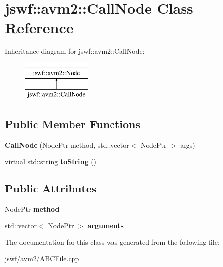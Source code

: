 \hypertarget{classjswf_1_1avm2_1_1_call_node}{\section{jswf\+:\+:avm2\+:\+:Call\+Node Class Reference}
\label{classjswf_1_1avm2_1_1_call_node}
}
Inheritance diagram for jswf\+:\+:avm2\+:\+:Call\+Node\+:\begin{figure}[H]
\begin{center}
\leavevmode
\includegraphics[height=2.000000cm]{classjswf_1_1avm2_1_1_call_node}
\end{center}
\end{figure}
\subsection*{Public Member Functions}
\begin{DoxyCompactItemize}
\item 
\hypertarget{classjswf_1_1avm2_1_1_call_node_a6be5d2f8dcafdc57b56689423060b9d6}{{\bfseries Call\+Node} (Node\+Ptr method, std\+::vector$<$ Node\+Ptr $>$ args)}\label{classjswf_1_1avm2_1_1_call_node_a6be5d2f8dcafdc57b56689423060b9d6}

\item 
\hypertarget{classjswf_1_1avm2_1_1_call_node_a6ff7d0186fa230106c49a1a562409a3b}{virtual std\+::string {\bfseries to\+String} ()}\label{classjswf_1_1avm2_1_1_call_node_a6ff7d0186fa230106c49a1a562409a3b}

\end{DoxyCompactItemize}
\subsection*{Public Attributes}
\begin{DoxyCompactItemize}
\item 
\hypertarget{classjswf_1_1avm2_1_1_call_node_abaa2df2b460bb8aeae051535223f0360}{Node\+Ptr {\bfseries method}}\label{classjswf_1_1avm2_1_1_call_node_abaa2df2b460bb8aeae051535223f0360}

\item 
\hypertarget{classjswf_1_1avm2_1_1_call_node_a7ca6391e3b98dd9ed4af494c3b2adb28}{std\+::vector$<$ Node\+Ptr $>$ {\bfseries arguments}}\label{classjswf_1_1avm2_1_1_call_node_a7ca6391e3b98dd9ed4af494c3b2adb28}

\end{DoxyCompactItemize}


The documentation for this class was generated from the following file\+:\begin{DoxyCompactItemize}
\item 
jswf/avm2/A\+B\+C\+File.\+cpp\end{DoxyCompactItemize}
